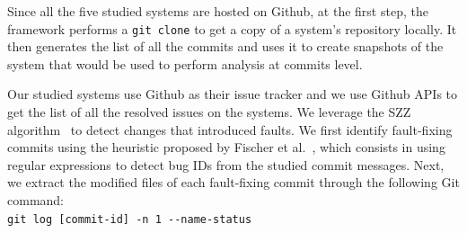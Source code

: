  Since all the five studied systems are hosted on Github, at the first step, the framework performs a \texttt{git clone} to get a copy of a system's repository locally. It then generates the list of all the commits and uses it to create snapshots of the system that would be used to perform analysis at commits level.

 Our studied systems use Github as their issue tracker and we use Github APIs to get the list of all the resolved issues on the systems. We leverage the SZZ algorithm~\cite{sliwerski2005changes} to detect changes that introduced faults. We first identify fault-fixing commits using the heuristic proposed by Fischer et al.~\cite{fischer2003populating}, which consists in using regular expressions to detect bug IDs from the studied commit messages. Next, we extract the modified files of each fault-fixing commit through the following Git command:\\

\texttt{git log [commit-id] -n 1 {-{}-}name-status}\\

